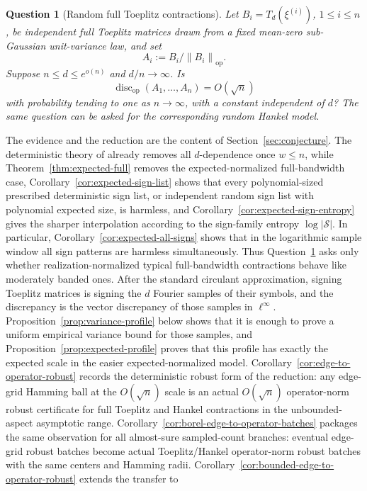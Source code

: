 \documentclass[11pt]{amsart}
\numberwithin{equation}{section}
\newtheorem{question}[theorem]{Question}
\theoremstyle{definition}
\theoremstyle{remark}
\newcommand{\op}{\mathrm{op}}
\newcommand{\discop}{\operatorname{disc}_{\op}}
\newcommand{\norm}[1]{\left\lVert #1\right\rVert}
\begin{document}
\begin{question}[Random full Toeplitz contractions]\label{q:main}
Let \(B_i=T_d(\xi^{(i)})\), \(1\le i\le n\), be independent full Toeplitz
matrices drawn from a fixed mean-zero sub-Gaussian unit-variance law, and set
\[
  A_i:=B_i/\norm{B_i}_{\op}.
\]
Suppose \(n\le d\le e^{o(n)}\) and \(d/n\to\infty\). Is
\[
\discop(A_1,\ldots,A_n)=O(\sqrt n)
\]
with probability tending to one as $n\to\infty$, with a constant independent of
$d$? The same question can be asked for the corresponding random Hankel model.
\end{question}

The evidence and the reduction are the content of
Section~\ref{sec:conjecture}. The deterministic theory of
\cite{Shmalo-paper12} already removes all $d$-dependence once $w\le n$, while
Theorem~\ref{thm:expected-full} removes the expected-normalized full-bandwidth
case, Corollary~\ref{cor:expected-sign-list} shows that every polynomial-sized
prescribed deterministic sign list, or independent random sign list with
polynomial expected size, is harmless, and
Corollary~\ref{cor:expected-sign-entropy} gives the sharper interpolation
according to the sign-family entropy \(\log|\mathcal S|\). In particular,
Corollary~\ref{cor:expected-all-signs} shows that in the logarithmic sample
window all sign patterns are harmless
simultaneously. Thus
Question~\ref{q:main} asks only whether realization-normalized typical
full-bandwidth contractions behave like moderately banded ones. After the
standard circulant approximation, signing Toeplitz matrices is signing the
$d$ Fourier samples of their symbols, and the discrepancy is the vector
discrepancy of those samples in $\ell^\infty$. Proposition~\ref{prop:variance-profile}
below shows that it is enough to prove a uniform empirical variance bound for
those samples, and Proposition~\ref{prop:expected-profile} proves that this
profile has exactly the expected scale in the easier expected-normalized model.
Corollary~\ref{cor:edge-to-operator-robust} records the deterministic robust
form of the reduction: any edge-grid Hamming ball at the \(O(\sqrt n)\) scale is
an actual \(O(\sqrt n)\) operator-norm robust certificate for full Toeplitz and
Hankel contractions in the unbounded-aspect asymptotic range.
Corollary~\ref{cor:borel-edge-to-operator-batches} packages the same observation
for all almost-sure sampled-count branches: eventual edge-grid robust batches
become actual Toeplitz/Hankel operator-norm robust batches with the same centers
and Hamming radii.
Corollary~\ref{cor:bounded-edge-to-operator-robust} extends the transfer to
\end{document}

